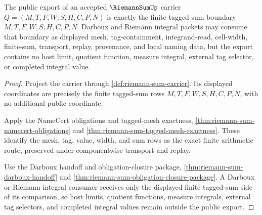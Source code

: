 \begin{theorem}
\label{thm:riemann-sum-public-finite-tagged-sum-interface}
The public export of an accepted $\RiemannSumUp$ carrier $Q=(M,T,F,W,S,H,C,P,N)$ is exactly the finite tagged-sum boundary $M,T,F,W,S,H,C,P,N$. Darboux and Riemann integral packets may consume that boundary as displayed mesh, tag-containment, integrand-read, cell-width, finite-sum, transport, replay, provenance, and local naming data, but the export contains no host limit, quotient function, measure integral, external tag selector, or completed integral value.
\end{theorem}
\begin{proof}
Project the carrier through \autoref{def:riemann-sum-carrier}. Its displayed coordinates are precisely the finite tagged-sum rows $M,T,F,W,S,H,C,P,N$, with no additional public coordinate.

Apply the NameCert obligations and tagged-mesh exactness, \autoref{thm:riemann-sum-namecert-obligations} and \autoref{thm:riemann-sum-tagged-mesh-exactness}. These identify the mesh, tag, value, width, and sum rows as the exact finite arithmetic route, preserved under componentwise transport and replay.

Use the Darboux handoff and obligation-closure package, \autoref{thm:riemann-sum-darboux-handoff} and \autoref{thm:riemann-sum-obligation-closure-package}. A Darboux or Riemann integral consumer receives only the displayed finite tagged-sum side of its comparison, so host limits, quotient functions, measure integrals, external tag selectors, and completed integral values remain outside the public export.
\end{proof}

